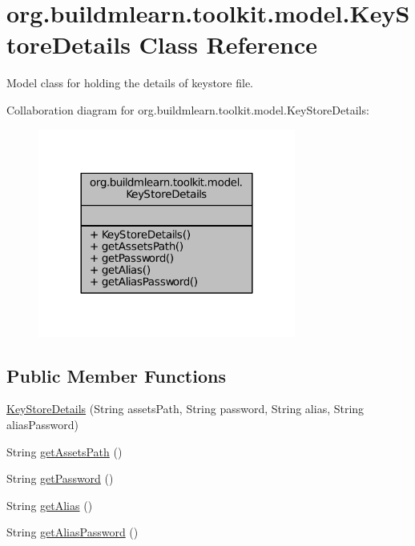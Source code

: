 \hypertarget{classorg_1_1buildmlearn_1_1toolkit_1_1model_1_1KeyStoreDetails}{\section{org.\-buildmlearn.\-toolkit.\-model.\-Key\-Store\-Details Class Reference}
\label{classorg_1_1buildmlearn_1_1toolkit_1_1model_1_1KeyStoreDetails}
}


Model class for holding the details of keystore file.  




Collaboration diagram for org.\-buildmlearn.\-toolkit.\-model.\-Key\-Store\-Details\-:
\nopagebreak
\begin{figure}[H]
\begin{center}
\leavevmode
\includegraphics[width=240pt]{da/dad/classorg_1_1buildmlearn_1_1toolkit_1_1model_1_1KeyStoreDetails__coll__graph}
\end{center}
\end{figure}
\subsection*{Public Member Functions}
\begin{DoxyCompactItemize}
\item 
\hyperlink{classorg_1_1buildmlearn_1_1toolkit_1_1model_1_1KeyStoreDetails_a8928a74a82e98926ce0090ceb85a7d3f}{Key\-Store\-Details} (String assets\-Path, String password, String alias, String alias\-Password)
\item 
String \hyperlink{classorg_1_1buildmlearn_1_1toolkit_1_1model_1_1KeyStoreDetails_ab3f06172d5a670983b711d3b32c6b742}{get\-Assets\-Path} ()
\item 
String \hyperlink{classorg_1_1buildmlearn_1_1toolkit_1_1model_1_1KeyStoreDetails_afab09fb7d5ad40c70ce0e1c7df720eb5}{get\-Password} ()
\item 
String \hyperlink{classorg_1_1buildmlearn_1_1toolkit_1_1model_1_1KeyStoreDetails_a27f0dbd2433e3b1044b8fceda27ab4ac}{get\-Alias} ()
\item 
String \hyperlink{classorg_1_1buildmlearn_1_1toolkit_1_1model_1_1KeyStoreDetails_ac9f20a209c0509b7d19d9949a5ba7831}{get\-Alias\-Password} ()
\end{DoxyCompactItemize}


